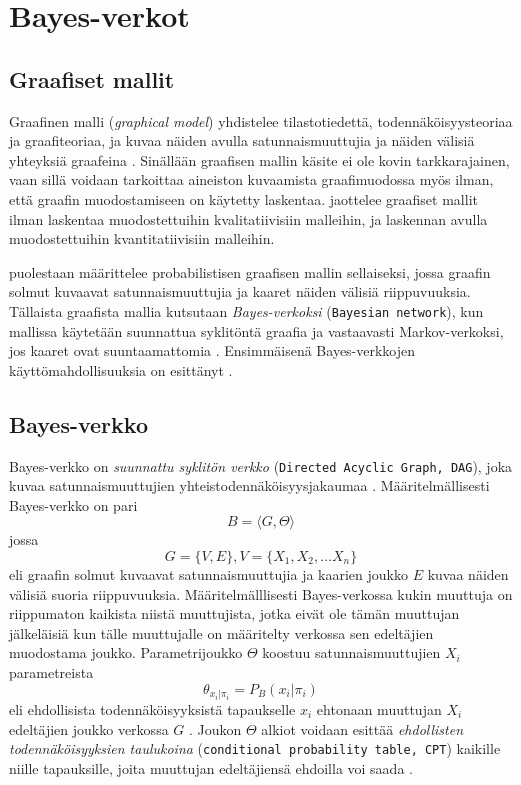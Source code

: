 \chapter{Bayes-verkot\label{bayes}}

\section{Graafiset mallit}
Graafinen malli (\emph{graphical model}) yhdistelee tilastotiedettä, todennäköisyysteoriaa ja graafiteoriaa, ja kuvaa näiden avulla satunnaismuuttujia ja näiden välisiä yhteyksiä graafeina \citep{jordan_graphical_2004}. Sinällään graafisen mallin käsite ei ole kovin tarkkarajainen, vaan sillä voidaan tarkoittaa aineiston kuvaamista graafimuodossa myös ilman, että graafin muodostamiseen on käytetty laskentaa. \citet{ramsahai_connecting_2020} jaottelee graafiset mallit ilman laskentaa muodostettuihin kvalitatiivisiin malleihin, ja laskennan avulla muodostettuihin kvantitatiivisiin malleihin. 

\citet{jordan_graphical_2004} puolestaan määrittelee probabilistisen graafisen mallin sellaiseksi, jossa graafin solmut kuvaavat satunnaismuuttujia ja kaaret näiden välisiä riippuvuuksia. Tällaista graafista mallia kutsutaan \emph{Bayes-verkoksi} (\texttt{Bayesian network}), kun mallissa käytetään suunnattua syklitöntä graafia ja vastaavasti Markov-verkoksi, jos kaaret ovat suuntaamattomia \citep{ruggeri_bayesian_2008}. Ensimmäisenä Bayes-verkkojen käyttömahdollisuuksia on esittänyt \citet{pearl_fusion_1986}.

\section{Bayes-verkko}
Bayes-verkko on \emph{suunnattu syklitön verkko} (\texttt{Directed Acyclic Graph, DAG}), joka kuvaa satunnaismuuttujien yhteistodennäköisyysjakaumaa \citep{ruggeri_bayesian_2008}. Määritelmällisesti Bayes-verkko on pari 
$$
    B = \langle G, \Theta \rangle
$$
jossa 
$$
    G = \{V, E\}, V = \{X_1, X_2,\ldots X_n\}
$$ 
eli graafin solmut kuvaavat satunnaismuuttujia ja kaarien joukko $E$ kuvaa näiden välisiä suoria riippuvuuksia. Määritelmälllisesti Bayes-verkossa kukin muuttuja on riippumaton kaikista niistä muuttujista, jotka eivät ole tämän muuttujan jälkeläisiä kun tälle muuttujalle on määritelty verkossa sen edeltäjien muodostama joukko. Parametrijoukko $\Theta$ koostuu satunnaismuuttujien $X_i$ parametreista 
$$
    \theta_{x_i|\pi_i} = P_B(x_i|\pi_i)
$$ 
eli ehdollisista todennäköisyyksistä tapaukselle $x_i$ ehtonaan muuttujan $X_i$ edeltäjien joukko verkossa $G$ \citep{ruggeri_bayesian_2008, myllymaki_bayes-verkkojen_1998}. Joukon $\Theta$ alkiot voidaan esittää \emph{ehdollisten todennäköisyyksien taulukoina}  (\texttt{conditional probability table, CPT}) kaikille niille tapauksille, joita muuttujan edeltäjiensä ehdoilla voi saada \citep{zhang_brief_2019}.

